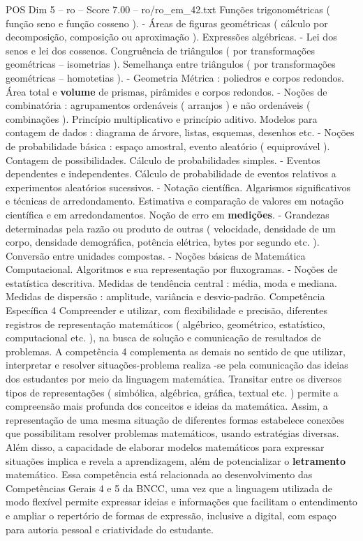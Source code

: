 \begin{textsample}{POS Dim 5 – ro – Score 7.00 – ro/ro\_em\_42.txt}
Funções trigonométricas ( função seno e função cosseno ). - Áreas de figuras geométricas ( cálculo por decomposição, composição ou aproximação ).
Expressões algébricas. - Lei dos senos e lei dos cossenos.
Congruência de triângulos ( por transformações geométricas – isometrias ).
Semelhança entre triângulos ( por transformações geométricas – homotetias ). - Geometria Métrica : poliedros e corpos redondos.
Área total e \textbf{volume} de prismas, pirâmides e corpos redondos. - Noções de combinatória : agrupamentos ordenáveis ( arranjos ) e não ordenáveis ( combinações ).
Princípio multiplicativo e princípio aditivo.
Modelos para contagem de dados : diagrama de árvore, listas, esquemas, desenhos etc. - Noções de probabilidade básica : espaço amostral, evento aleatório ( equiprovável ).
Contagem de possibilidades.
Cálculo de probabilidades simples. - Eventos dependentes e independentes.
Cálculo de probabilidade de eventos relativos a experimentos aleatórios sucessivos. - Notação científica.
Algarismos significativos e técnicas de arredondamento.
Estimativa e comparação de valores em notação científica e em arredondamentos.
Noção de erro em \textbf{medições}. - Grandezas determinadas pela razão ou produto de outras ( velocidade, densidade de um corpo, densidade demográfica, potência elétrica, bytes por segundo etc. ).
Conversão entre unidades compostas. - Noções básicas de Matemática Computacional.
Algoritmos e sua representação por fluxogramas. - Noções de estatística descritiva.
Medidas de tendência central : média, moda e mediana.
Medidas de dispersão : amplitude, variância e desvio-padrão.
Competência Específica 4 Compreender e utilizar, com flexibilidade e precisão, diferentes registros de representação matemáticos ( algébrico, geométrico, estatístico, computacional etc. ), na busca de solução e comunicação de resultados de problemas.
A competência 4 complementa as demais no sentido de que utilizar, interpretar e resolver situações-problema realiza -se pela comunicação das ideias dos estudantes por meio da linguagem matemática.
Transitar entre os diversos tipos de representações ( simbólica, algébrica, gráfica, textual etc. ) permite a compreensão mais profunda dos conceitos e ideias da matemática.
Assim, a representação de uma mesma situação de diferentes formas estabelece conexões que possibilitam resolver problemas matemáticos, usando estratégias diversas.
Além disso, a capacidade de elaborar modelos matemáticos para expressar situações implica e revela a aprendizagem, além de potencializar o \textbf{letramento} matemático.
Essa competência está relacionada ao desenvolvimento das Competências Gerais 4 e 5 da BNCC, uma vez que a linguagem utilizada de modo flexível permite expressar ideias e informações que facilitam o entendimento e ampliar o repertório de formas de expressão, inclusive a digital, com espaço para autoria pessoal e criatividade do estudante.

\end{textsample}

